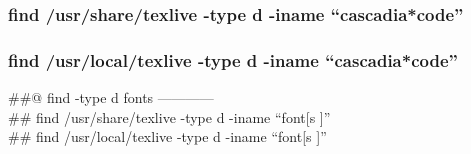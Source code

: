 \documentclass[
]{article}
\newenvironment{Shaded}{\begin{snugshade}}{\end{snugshade}}
\newcommand{\AttributeTok}[1]{\textcolor[rgb]{0.13,0.29,0.53}{#1}}
\newcommand{\ConstantTok}[1]{\textcolor[rgb]{0.56,0.35,0.01}{#1}}
\newcommand{\ControlFlowTok}[1]{\textcolor[rgb]{0.13,0.29,0.53}{\textbf{#1}}}
\newcommand{\DecValTok}[1]{\textcolor[rgb]{0.00,0.00,0.81}{#1}}
\newcommand{\FunctionTok}[1]{\textcolor[rgb]{0.13,0.29,0.53}{\textbf{#1}}}
\newcommand{\NormalTok}[1]{#1}
\newcommand{\SpecialCharTok}[1]{\textcolor[rgb]{0.81,0.36,0.00}{\textbf{#1}}}
\newcommand{\StringTok}[1]{\textcolor[rgb]{0.31,0.60,0.02}{#1}}
\begin{document}
\hypertarget{find-usrsharetexlive--type-d--iname-cascadiacode}{%
\subsubsection{find /usr/share/texlive -type d -iname
``cascadia*code''}\label{find-usrsharetexlive--type-d--iname-cascadiacode}}

\hypertarget{find-usrlocaltexlive--type-d--iname-cascadiacode}{%
\subsubsection{find /usr/local/texlive -type d -iname
``cascadia*code''}\label{find-usrlocaltexlive--type-d--iname-cascadiacode}}

\begin{Shaded}
\end{Shaded}

\#\#@ find -type d fonts ------------\\
\#\# find /usr/share/texlive -type d -iname ``font{[}s {]}''\\
\#\# find /usr/local/texlive -type d -iname ``font{[}s {]}''
\end{document}
